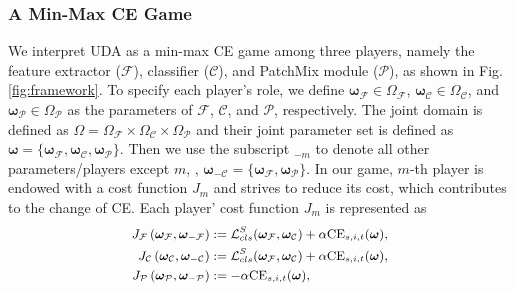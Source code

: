 \documentclass[10pt,twocolumn,letterpaper, ]{article}
\begin{document}
\subsubsection{A Min-Max CE Game}
We interpret UDA as a min-max CE game among three players, namely the feature extractor ($\mathcal{F}$), classifier ($\mathcal{C}$), and PatchMix module ($\mathcal{P}$), as shown in Fig. \ref{fig:framework}. 
To specify each player's role, we define $\boldsymbol{\omega}_{\mathcal{F}} \in \Omega_{\mathcal{F}}$, $\boldsymbol{\omega}_{\mathcal{C}} \in \Omega_{\mathcal{C}}$, and $\boldsymbol{\omega}_{\mathcal{P}} \in \Omega_{\mathcal{P}}$ as the parameters of $\mathcal F$, $\mathcal C$, and $\mathcal P$, respectively. The joint domain is defined as $\Omega = \Omega_{\mathcal{F}} \times \Omega_{\mathcal{C}} \times \Omega_{\mathcal{P}}$ and their joint parameter set is defined as $\boldsymbol{\omega}=\{\boldsymbol{\omega}_{\mathcal{F}}, \boldsymbol{\omega}_{\mathcal{C}}, \boldsymbol{\omega}_{\mathcal{P}}\}$. 
Then we use the subscript $_{-m}$ to denote all other parameters/players except $m$, \eg, $\boldsymbol{\omega}_{-{\mathcal{C}}} = \{\boldsymbol{\omega}_{\mathcal{F}},\boldsymbol{\omega}_{\mathcal{P}}\}$. In our game, $m$-th player is endowed with a cost function $J_{m}$ and strives to reduce its cost, which contributes to the change of CE. Each player' cost function $J_{m}$ is represented as
{\setlength\abovedisplayskip{2pt}
\setlength\belowdisplayskip{2pt}
\begin{equation}
\small
\begin{split}\label{eq:objective1}
J_{{\mathcal{F}}}\left(\boldsymbol{\omega}_{\mathcal{F}}, \boldsymbol{\omega}_{-{\mathcal{F}}}\right) &:=\mathcal{L}_{cls}^{S}(\boldsymbol{\omega}_{\mathcal{F}}, \boldsymbol{\omega}_{\mathcal{C}})+\alpha {\text{CE}}_{s,i, t}(\boldsymbol{\omega}),\\ 
J_{{\mathcal{C}}}\left(\boldsymbol{\omega}_{\mathcal{C}}, \boldsymbol{\omega}_{-{\mathcal{C}}}\right) &:=\mathcal{L}_{cls}^{S}(\boldsymbol{\omega}_{\mathcal{F}}, \boldsymbol{\omega}_{\mathcal{C}})+\alpha {\text{CE}}_{s,i, t}(\boldsymbol{\omega}),\\ 
J_{{\mathcal{P}}}\left(\boldsymbol{\omega}_{{\mathcal{P}}}, \boldsymbol{\omega}_{-{\mathcal{P}}}\right) &:=-\alpha {\text{CE}}_{s,i, t}(\boldsymbol{\omega}),    
\end{split}
\end{equation}}
\end{document}
